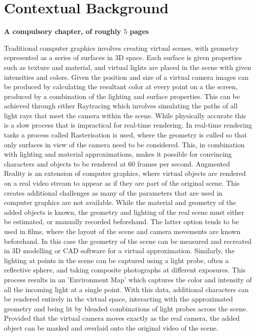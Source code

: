 \documentclass[ %
                    author={Gavin Parker},
                supervisor={Dr. Neill Campbell},
                    degree={MEng},
                     title={Deep Siamese Networks for Illumination Estimation from Stereo Images},
                  subtitle={},
                      type={research},
                      year={2018} ]{dissertation}
\begin{document}
\mainmatter


\chapter{Contextual Background}
\label{chap:context}

{\bf A compulsory chapter,     of roughly $5$ pages}
\vspace{1cm} 

\noindent
Traditional computer graphics involves creating virtual scenes, with geometry represented as a series of surfaces in 3D space. Each surface is given properties such as texture and material, and virtual lights are placed in the scene with given intensities and colors. Given the position and size of a virtual camera images can be produced by calculating the resultant color at every point on a the screen, produced by a combination of the lighting and surface properties. This can be achieved through either Raytracing which involves simulating the paths of all light rays that meet the camera within the scene. While physically accurate this is a slow process that is impractical for real-time rendering. In real-time rendering tasks a process called Rasterisation is used, where the geometry is culled so that only surfaces in view of the camera need to be considered. This, in combination with lighting and material approximations, makes it possible for convincing characters and objects to be rendered at 60 frames per second.
\newline
Augmented Reality is an extension of computer graphics, where virtual objects are rendered on a real video stream to appear as if they are part of the original scene. This creates additional challenges as many of the parameters that are used in computer graphics are not available. While the material and geometry of the added objects is known, the geometry and lighting of the real scene must either be estimated, or manually recorded beforehand. The latter option tends to be used in films, where the layout of the scene and camera movements are known beforehand. In this case the geometry of the scene can be measured and recreated in 3D modelling or CAD software for a virtual approximation. Similarly, the lighting at points in the scene can be captured using a light probe, often a reflective sphere, and taking composite photographs at different exposures. This process results in an 'Environment Map' which captures the color and intensity of all the incoming light at a single point. With this data, additional characters can be rendered entirely in the virtual space, interacting with the approximated geometry and being lit by blended combinations of light probes across the scene. Provided that the virtual camera moves exactly as the real camera, the added object can be masked and overlaid onto the original video of the scene.
\end{document}
